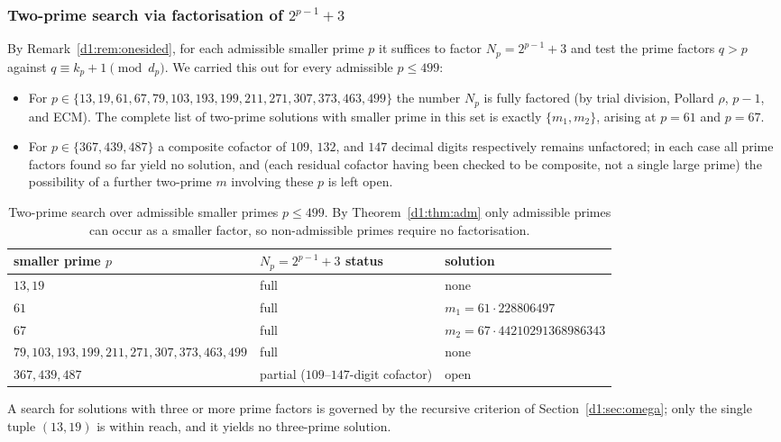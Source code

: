\documentclass[a4paper]{article}
\theoremstyle{plain}
\theoremstyle{definition}
\theoremstyle{remark}
\begin{document}
\subsubsection{Two-prime search via factorisation of \texorpdfstring{$2^{p-1}+3$}{2^(p-1)+3}}
By Remark~\ref{d1:rem:onesided}, for each admissible smaller prime $p$ it suffices to factor
$N_{p}=2^{p-1}+3$ and test the prime factors $q>p$ against $q\equiv k_{p}+1\pmod{d_{p}}$. We
carried this out for every admissible $p\le 499$:
\begin{itemize}[nosep]
\item For $p\in\{13,19,61,67,79,103,193,199,211,271,307,373,463,499\}$ the number $N_{p}$ is
fully factored (by trial division, Pollard $\rho$, $p-1$, and ECM). The complete list of
two-prime solutions with smaller prime in this set is exactly $\{m_{1},m_{2}\}$, arising at
$p=61$ and $p=67$.
\item For $p\in\{367,439,487\}$ a composite cofactor of $109$, $132$, and $147$ decimal digits
respectively remains unfactored; in each case all prime factors found so far yield no solution,
and (each residual cofactor having been checked to be composite, not a single large prime) the
possibility of a further two-prime $m$ involving these $p$ is left open.
\end{itemize}

\begin{table}[H]
\centering
\small
\begin{tabular}{lll}
\toprule
smaller prime $p$ & $N_{p}=2^{p-1}+3$ status & solution \\
\midrule
$13,19$ & full & none \\
$61$ & full & $m_{1}=61\cdot 228806497$ \\
$67$ & full & $m_{2}=67\cdot 44210291368986343$ \\
$79,103,193,199,211,271,307,373,463,499$ & full & none \\
$367,439,487$ & partial ($109$--$147$-digit cofactor) & open \\
\bottomrule
\end{tabular}
\caption{Two-prime search over admissible smaller primes $p\le 499$. By Theorem~\ref{d1:thm:adm}
only admissible primes can occur as a smaller factor, so non-admissible primes require no
factorisation.}
\label{d1:tab:search}
\end{table}

A search for solutions with three or more prime factors is governed by the recursive criterion
of Section~\ref{d1:sec:omega}; only the single tuple $(13,19)$ is within reach, and it yields no
three-prime solution.
\end{document}
